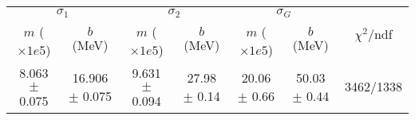 \begin{tabular}{cc|cc|cc||c}
\multicolumn{2}{c|}{$\sigma_1$} & \multicolumn{2}{|c}{$\sigma_2$} & \multicolumn{2}{|c}{$\sigma_G$}  & \multirow{2}{*}{$\chi^2/$ndf}\\
$m$ ($\times1e5$) & $b$ (MeV) & $m$ ($\times1e5$) & $b$ (MeV) & $m$ ($\times1e5$) & $b$ (MeV) & \\
\hline
8.063 $\pm$ 0.075 & 16.906 $\pm$ 0.075 & 9.631 $\pm$ 0.094 & 27.98 $\pm$ 0.14 & 20.06 $\pm$ 0.66 & 50.03 $\pm$ 0.44 & 3462/1338\\
\end{tabular}
